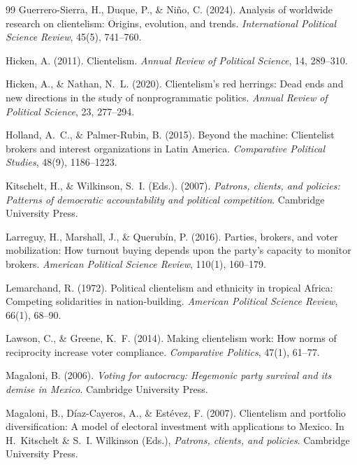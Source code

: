 \documentclass[12pt,letterpaper]{article}
\begin{document}
\begin{thebibliography}{99}
Guerrero-Sierra, H., Duque, P., \& Ni\~{n}o, C. (2024). Analysis of worldwide research on clientelism: Origins, evolution, and trends. \textit{International Political Science Review}, 45(5), 741--760.

Hicken, A. (2011). Clientelism. \textit{Annual Review of Political Science}, 14, 289--310.

Hicken, A., \& Nathan, N.~L. (2020). Clientelism's red herrings: Dead ends and new directions in the study of nonprogrammatic politics. \textit{Annual Review of Political Science}, 23, 277--294.

Holland, A.~C., \& Palmer-Rubin, B. (2015). Beyond the machine: Clientelist brokers and interest organizations in Latin America. \textit{Comparative Political Studies}, 48(9), 1186--1223.

Kitschelt, H., \& Wilkinson, S.~I. (Eds.). (2007). \textit{Patrons, clients, and policies: Patterns of democratic accountability and political competition}. Cambridge University Press.

Larreguy, H., Marshall, J., \& Querub\'{i}n, P. (2016). Parties, brokers, and voter mobilization: How turnout buying depends upon the party's capacity to monitor brokers. \textit{American Political Science Review}, 110(1), 160--179.

Lemarchand, R. (1972). Political clientelism and ethnicity in tropical Africa: Competing solidarities in nation-building. \textit{American Political Science Review}, 66(1), 68--90.

Lawson, C., \& Greene, K.~F. (2014). Making clientelism work: How norms of reciprocity increase voter compliance. \textit{Comparative Politics}, 47(1), 61--77.

Magaloni, B. (2006). \textit{Voting for autocracy: Hegemonic party survival and its demise in Mexico}. Cambridge University Press.

Magaloni, B., D\'{i}az-Cayeros, A., \& Est\'{e}vez, F. (2007). Clientelism and portfolio diversification: A model of electoral investment with applications to Mexico. In H.~Kitschelt \& S.~I. Wilkinson (Eds.), \textit{Patrons, clients, and policies}. Cambridge University Press.


\end{thebibliography}
\end{document}
